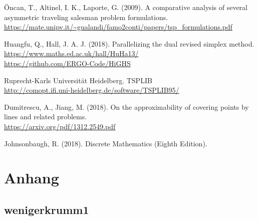 \documentclass[a4paper, 10pt, ngerman]{article}
\begin{document}
\begin{thebibliography}{4}
    Öncan, T., Altinel, I. K., Laporte, G. (2009).
    A comparative analysis of several asymmetric traveling salesman problem formulations. \\
    \href{https://mate.unipv.it/gualandi/famo2conti/papers/tsp_formulations.pdf}{https://mate.unipv.it/\textasciitilde{}gualandi/famo2conti/papers/tsp\_formulations.pdf}
    
    Huangfu, Q., Hall, J. A. J. (2018).
    Parallelizing the dual revised simplex method. \\
    \href{https://www.maths.ed.ac.uk/hall/HuHa13/}{https://www.maths.ed.ac.uk/hall/HuHa13/} \\
    \href{https://github.com/ERGO-Code/HiGHS}{https://github.com/ERGO-Code/HiGHS}

    Ruprecht-Karls Universität Heidelberg. TSPLIB \\
    \href{http://comopt.ifi.uni-heidelberg.de/software/TSPLIB95/}{http://comopt.ifi.uni-heidelberg.de/software/TSPLIB95/}

    Dumitrescu, A., Jiang, M. (2018).
    On the approximability of covering points by lines and related problems. \\
    \href{https://arxiv.org/pdf/1312.2549.pdf}{https://arxiv.org/pdf/1312.2549.pdf}

    Johnsonbaugh, R. (2018). 
    Discrete Mathematics (Eighth Edition).
\end{thebibliography}

\section*{Anhang}

\subsection*{wenigerkrumm1}
\end{document}
